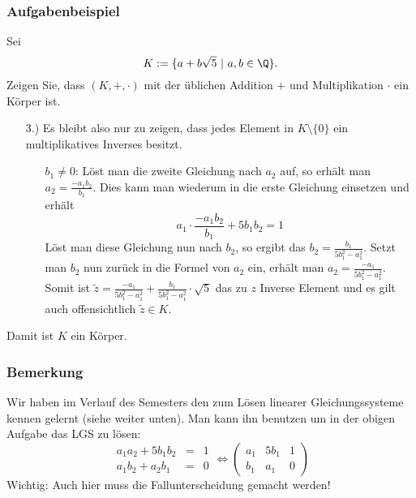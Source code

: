 %
\begin{frame}\frametitle{Aufgabenbeispiel}
Sei
$$
	K := \{ a + b\sqrt{5} ~|~a,b \in \Q \}. 
$$
Zeigen Sie, dass $(K,+,\cdot)$ mit der \"ublichen Addition $+$ und Multiplikation $\cdot$ ein  K\"orper ist.\\\vfill
{}
\begin{itemize}
\item[3.)] Es bleibt also nur zu zeigen, dass jedes Element in $K \setminus \{0\}$ ein multiplikatives Inverses besitzt.
\begin{itemize}
\item[$b_1\ne 0$:]
L\"ost man die zweite Gleichung nach $a_2$ auf, so erh\"alt man $a_2=\frac{-a_1b_2}{b_1}$. Dies kann man wiederum in die erste Gleichung einsetzen und erh\"alt
$$
a_1\cdot \frac{-a_1b_2}{b_1} + 5b_1b_2=1
$$
L\"ost man diese Gleichung nun nach $b_2$, so ergibt das $b_2=\frac{b_1}{5b_1^2-a_1^2}$. Setzt man $b_2$ nun zur\"uck in die Formel von $a_2$ ein, erh\"alt man $a_2=\frac{-a_1}{5b_1^2-a_1^2}$.\\
Somit ist $\tilde z=\frac{-a_1}{5b_1^2-a_1^2} + \frac{b_1}{5b_1^2-a_1^2} \cdot \sqrt{5}$ das zu $z$ Inverse Element und es gilt auch offensichtlich $\tilde z \in K$. 
\end{itemize}
\end{itemize}
Damit ist $K$ ein K\"orper.
\end{frame}
%
%
\begin{frame}\frametitle{Bemerkung}
Wir haben im Verlauf des Semesters den  zum Lösen linearer Gleichungssysteme kennen gelernt (siehe weiter unten). Man kann ihn benutzen um in der obigen Aufgabe das LGS zu lösen:
$$\begin{array}{rcl}
a_1a_2 + 5b_1b_2&=&1\\
a_1b_2 + a_2b_1&=&0
\end{array} \Longleftrightarrow 
\left(\begin{array}{cc|c}
a_1 & 5b_1&1\\
b_1&  a_1&0
\end{array}\right)
$$
Wichtig: Auch hier muss die Fallunterscheidung gemacht werden!
\end{frame}
%
